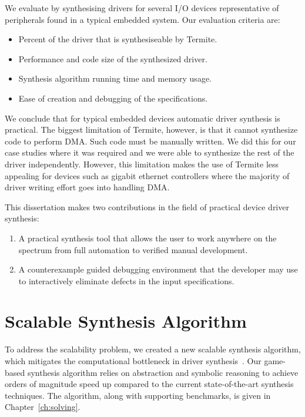 We evaluate \termite by synthesising drivers for several I/O devices representative of peripherals found in a typical embedded system. Our evaluation criteria are:
\begin{itemize}
    \item Percent of the driver that is synthesiseable by Termite.
    \item Performance and code size of the synthesized driver.
    \item Synthesis algorithm running time and memory usage.
    \item Ease of creation and debugging of the specifications.
\end{itemize}

We conclude that for typical embedded devices automatic driver synthesis is practical. The biggest limitation of Termite, however, is that it cannot synthesize code to perform DMA. Such code must be manually written. We did this for our case studies where it was required and we were able to synthesize the rest of the driver independently. However, this limitation makes the use of Termite less appealing for devices such as gigabit ethernet controllers where the majority of driver writing effort goes into handling DMA.

This dissertation makes two contributions in the field of practical device driver synthesis:
\begin{enumerate}
    \item A practical synthesis tool that allows the user to work anywhere on the spectrum from full automation to verified manual development.
    \item A counterexample guided debugging environment that the developer may use to interactively eliminate defects in the input specifications.
\end{enumerate}

\section{Scalable Synthesis Algorithm}
\label{sec:scalable_synth}

To address the scalability problem, we created a new scalable synthesis algorithm, which mitigates the computational bottleneck in driver synthesis~\cite{Walker_Ryzhyk_14}. Our game-based synthesis algorithm relies on abstraction and symbolic reasoning to achieve orders of magnitude speed up compared to the current state-of-the-art synthesis techniques. The algorithm, along with supporting benchmarks, is given in Chapter~\ref{ch:solving}.

